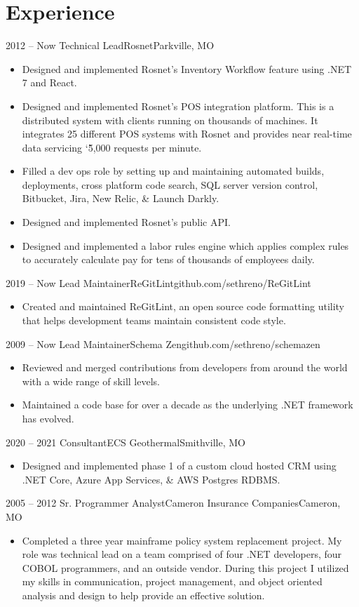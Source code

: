 \documentclass[11pt,letterpaper,final]{moderncv}
\begin{document}
\section{Experience} 
	\cventry
{2012 -- Now} {Technical Lead}{Rosnet}{Parkville, MO}{}{
		\begin{itemize}
			\item
				Designed and implemented Rosnet's Inventory Workflow
				feature using .NET 7 and React.
			\item
				Designed and implemented Rosnet's POS integration
				platform. This is a distributed system with clients
				running on thousands of machines. It integrates 25
				different POS systems with Rosnet and provides near
				real-time data servicing \char`\~5,000 requests per
				minute.
			\item
				Filled a dev ops role by setting up and maintaining
				automated builds, deployments, cross platform code
				search, SQL server version control, Bitbucket, Jira,
				New Relic, \& Launch Darkly.
			\item
				Designed and implemented Rosnet's public API.
			\item
				Designed and implemented a labor rules engine which
				applies complex rules to accurately calculate pay for
				tens of thousands of employees daily.
		\end{itemize}
}
	\cventry
{2019 -- Now} {Lead Maintainer}{ReGitLint}{github.com/sethreno/ReGitLint}{}{
		\begin{itemize}
			\item 
				Created and maintained ReGitLint, an open source code formatting
				utility that helps development teams maintain consistent code
				style.
		\end{itemize}
}
	\cventry
{2009 -- Now} {Lead Maintainer}{Schema Zen}{github.com/sethreno/schemazen}{}{
		\begin{itemize}
			\item 
				Reviewed and merged contributions from developers from around the world
				with a wide range of skill levels.
			\item 
				Maintained a code base for over a decade as the underlying .NET
				framework has evolved.
		\end{itemize}
}
	\cventry
{2020 -- 2021} {Consultant}{ECS Geothermal}{Smithville, MO}{}{
		\begin{itemize}
			\item 
				Designed and implemented phase 1 of a custom cloud hosted CRM
				using .NET Core, Azure App Services, \& AWS Postgres RDBMS.
		\end{itemize}
}
	\cventry
{2005 -- 2012} {Sr. Programmer Analyst}{Cameron Insurance Companies}{Cameron, MO}{}{
		\begin{itemize}
			\item 
				Completed a three year mainframe policy system
				replacement project. My role was technical lead on a
				team comprised of four .NET developers, four COBOL
				programmers, and an outside vendor. During this project
				I utilized my skills in communication, project
				management, and object oriented analysis and design to
				help provide an effective solution.
		\end{itemize}
}
\end{document}
